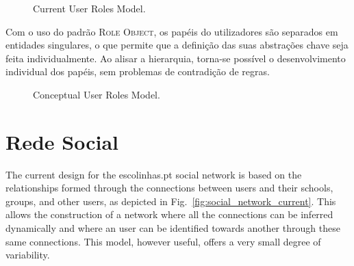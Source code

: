 \documentclass[9pt,a4paper]{extarticle}
\begin{document}
\begin{multicols}{2}

\begin{figure}[H]
  \caption{Current User Roles Model.}
  \label{fig:user_roles_current}
\end{figure}


Com o uso do padrão \textsc{Role Object}, os papéis do utilizadores são separados em entidades singulares, o que permite que a definição das suas abstrações chave seja feita individualmente. Ao alisar a hierarquia, torna-se possível o desenvolvimento individual dos papéis, sem problemas de contradição de regras.

\begin{figure}[H]
  \caption{Conceptual User Roles Model.}
  \label{fig:user_roles_conceptual}
\end{figure}

\section{Rede Social}\label{sec:social_network}

The current design for the escolinhas.pt social network is based on the relationships formed through the connections between users and their schools, groups, and other users, as depicted in Fig.~\ref{fig:social_network_current}. This allows the construction of a network where all the connections can be inferred dynamically and where an user can be identified towards another through these same connections. This model, however useful, offers a very small degree of variability.


\end{multicols}
\end{document}
